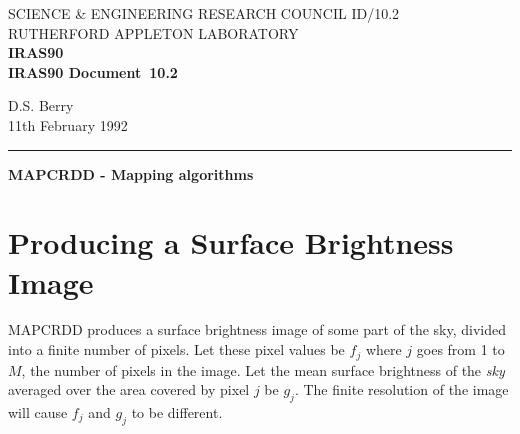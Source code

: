 \pagestyle{myheadings}

\newcommand{\irasdoccategory}  {IRAS90 Document}
\newcommand{\irasdocinitials}  {ID}
\newcommand{\irasdocnumber}    {10.2}
\newcommand{\irasdocauthors}   {D.S. Berry}
\newcommand{\irasdocdate}      {11th February 1992}
\newcommand{\irasdoctitle}     {MAPCRDD -  Mapping algorithms}

\newcommand{\irasdocname}{\irasdocinitials /\irasdocnumber}
\renewcommand{\_}{{\tt\char'137}}     %
\markright{\irasdocname}
\setlength{\textwidth}{160mm}
\setlength{\textheight}{240mm}
\setlength{\topmargin}{-5mm}
\setlength{\oddsidemargin}{0mm}
\setlength{\evensidemargin}{0mm}
\setlength{\parindent}{0mm}
\setlength{\parskip}{\medskipamount}
\setlength{\unitlength}{1mm}



\thispagestyle{empty}
SCIENCE \& ENGINEERING RESEARCH COUNCIL \hfill \irasdocname\\
RUTHERFORD APPLETON LABORATORY\\
{\large\bf IRAS90\\}
{\large\bf \irasdoccategory\ \irasdocnumber}
\begin{flushright}
\irasdocauthors\\
\irasdocdate
\end{flushright}
\vspace{-4mm}
\rule{\textwidth}{0.5mm}
\vspace{5mm}
\begin{center}
{\Large\bf \irasdoctitle}
\end{center}
\vspace{5mm}
\setlength{\parskip}{0mm}
\tableofcontents
\setlength{\parskip}{\medskipamount}
\markright{\irasdocname}

\section{Producing a Surface Brightness Image}
MAPCRDD produces a surface brightness image of some part of the sky, divided
into a finite number of pixels. Let these pixel values be $f_{j}$ where $j$ goes
from 1 to $M$, the number of pixels in the image. Let the mean surface
brightness of the {\em sky} averaged over the area covered by pixel $j$ be
$g_{j}$. The finite resolution of the image will cause $f_{j}$ and $g_{j}$ to be
different. 


